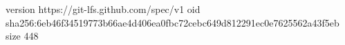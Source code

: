 version https://git-lfs.github.com/spec/v1
oid sha256:6eb46f34519773b66ae4d406ea0fbc72cebc649d812291ec0e7625562a43f5eb
size 448
